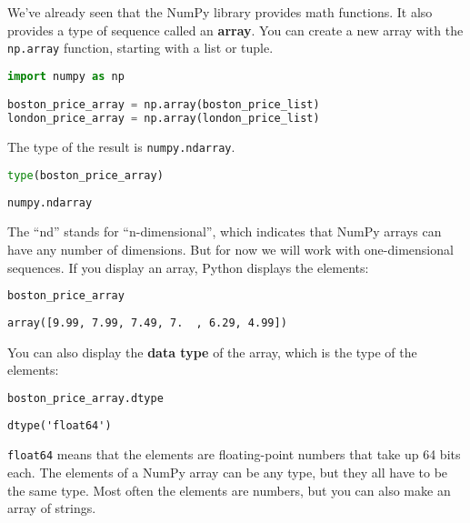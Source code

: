 We've already seen that the NumPy library provides math functions. It
also provides a type of sequence called an \textbf{array}. You can
create a new array with the \passthrough{\lstinline!np.array!} function,
starting with a list or tuple.

\begin{lstlisting}[language=Python,style=source]
import numpy as np

boston_price_array = np.array(boston_price_list)
london_price_array = np.array(london_price_list)
\end{lstlisting}

The type of the result is \passthrough{\lstinline!numpy.ndarray!}.

\begin{lstlisting}[language=Python,style=source]
type(boston_price_array)
\end{lstlisting}

\begin{lstlisting}[style=output]
numpy.ndarray
\end{lstlisting}

The ``nd'' stands for ``n-dimensional'', which indicates that NumPy
arrays can have any number of dimensions. But for now we will work with
one-dimensional sequences. If you display an array, Python displays the
elements:

\begin{lstlisting}[language=Python,style=source]
boston_price_array
\end{lstlisting}

\begin{lstlisting}[style=output]
array([9.99, 7.99, 7.49, 7.  , 6.29, 4.99])
\end{lstlisting}

You can also display the \textbf{data type} of the array, which is the
type of the elements:

\begin{lstlisting}[language=Python,style=source]
boston_price_array.dtype
\end{lstlisting}

\begin{lstlisting}[style=output]
dtype('float64')
\end{lstlisting}

\passthrough{\lstinline!float64!} means that the elements are
floating-point numbers that take up 64 bits each. The elements of a
NumPy array can be any type, but they all have to be the same type. Most
often the elements are numbers, but you can also make an array of
strings.

